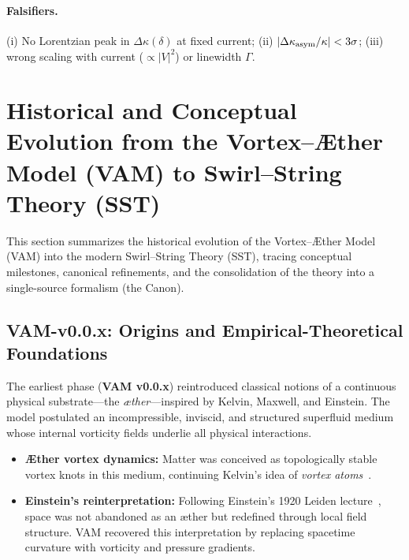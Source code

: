 \documentclass[10pt,reprint,aps,onecolumn,nofootinbib]{revtex4-2}
\begin{document}
    \paragraph{Falsifiers.} (i) No Lorentzian peak in $\Delta\kappa(\delta)$ at fixed current; (ii) $|\Delta\kappa_{\rm asym}/\kappa|<3\sigma$; (iii) wrong scaling with current ($\propto |V|^2$) or linewidth $\Gamma$.


    \section{Historical and Conceptual Evolution from the Vortex--Æther Model (VAM) to Swirl--String Theory (SST)}
    \label{sec:HistoryEvolution}


    \begin{tcolorbox}[colback=gray!5,colframe=black,title={Canonical Context}]
        This section summarizes the historical evolution of the Vortex--Æther Model (VAM) into the modern Swirl--String Theory (SST), tracing conceptual milestones, canonical refinements, and the consolidation of the theory into a single-source formalism (the Canon).
    \end{tcolorbox}

    \subsection{VAM-v0.0.x: Origins and Empirical-Theoretical Foundations}

        The earliest phase (\textbf{VAM v0.0.x}) reintroduced classical notions of a continuous physical substrate---the \emph{æther}---inspired by Kelvin, Maxwell, and Einstein.
        The model postulated an incompressible, inviscid, and structured superfluid medium whose internal vorticity fields underlie all physical interactions.

        \begin{itemize}
            \item \textbf{Æther vortex dynamics:} Matter was conceived as topologically stable vortex knots in this medium, continuing Kelvin's idea of \emph{vortex atoms}~\cite{Kelvin1867}.
            \item \textbf{Einstein's reinterpretation:} Following Einstein's 1920 Leiden lecture~\cite{Einstein1920}, space was not abandoned as an æther but redefined through local field structure. VAM recovered this interpretation by replacing spacetime curvature with vorticity and pressure gradients.
        \end{itemize}
\end{document}
